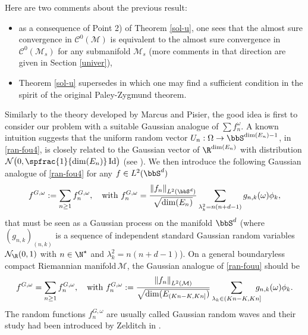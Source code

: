 Here are two comments about the previous result:
\begin{itemize}
\item as a consequence of Point 2) of Theorem \ref{sol-u}, one sees that the almost sure convergence in $\mathcal{C}^0(\mathcal{M})$ is equivalent to the almost sure convergence in $\mathcal{C}^0(\mathcal{M}_s)$ for any submanifold $\mathcal{M}_s$ (more comments in that direction are given in Section \ref{univer}),
\item Theorem \ref{sol-u} supersedes \cite[Th.\,2.1]{imek-aif} in which one may find a sufficient condition in the spirit of the original Paley-Zygmund theorem.
\end{itemize}

Similarly to the theory developed by Marcus and Pisier, the good idea is first to consider our problem with a suitable Gaussian analogue of $\sum f_n^\omega$.
A known intuition suggests that the uniform random vector $U_n:\Omega\to \bbS^{\dim(E_n)-1}$, in \eqref{ran-fou4}, is closely related to the Gaussian vector of $\R^{\dim(E_n)}$ with distribution $\mathcal{N}\bigl(0,\spfrac{1}{\dim(E_n)}\operatorname{Id}\bigr)$ (see \cite[p.\,58]{pisiervol}). We then introduce the following Gaussian analogue of \eqref{ran-fou4} for any $f\in L^2(\bbS^d)$\vspace*{-3pt}
\begin{equation}\label{ran-fouG}
f^{G,\omega}:=\sum_{n\geq 1} f_n^{G,\omega}, \quad \text{with } f_n^{G,\omega}= \frac{\left\Vert f_n\right\Vert_{L^2(\bbS^d)}}{\sqrt{\dim(E_n)}}\sum_{\lambda_k^2=n(n+d-1)} g_{n,k} (\omega)\phi_k,
\end{equation}
that must be seen as a Gaussian process on the manifold $\bbS^d$ (where $(g_{n,k})_{(n,k)}$ is a sequence of independent standard Gaussian random variables $\mathcal{N}_\R(0,1)$ with $n\in \N^\star$ and $\lambda_k^2=n(n+d-1)$).
On a general boundaryless compact Riemannian manifold\,$\mathcal{M}$, the Gaussian analogue of \eqref{ran-fouu} should be\vspace*{-3pt}
\begin{equation} \label{ran-fouG2}
f^{G,\omega} = \sum_{n\geq 1}f_n^{G,\omega}, \quad \text{with } f_n^{G,\omega}:=\frac{\left\Vert f_n\right\Vert_{L^2(\mathcal{M})}}{\sqrt{\dim(E_{(Kn-K,Kn]})}}\sum_{\lambda_k \in (Kn-K,Kn]}\hspace*{-3mm} g_{n,k}(\omega) \phi_k.
\end{equation}
The random functions $f_n^{G,\omega}$ are usually called Gaussian random waves and their study had been introduced by Zelditch in \cite{zelditch2009real}.

